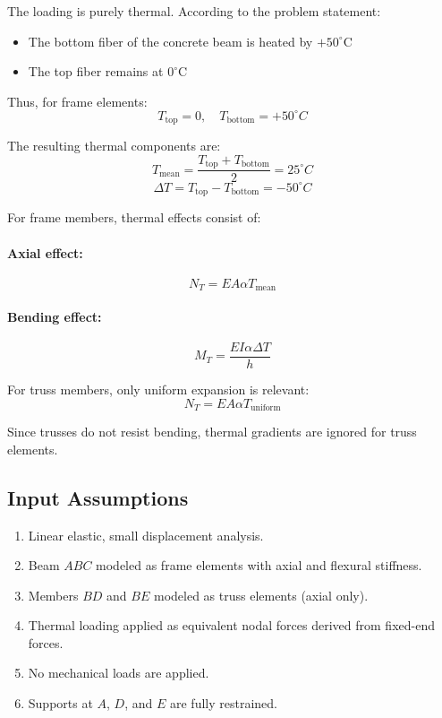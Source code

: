 The loading is purely thermal. According to the problem statement:

\begin{itemize}
    \item The bottom fiber of the concrete beam is heated by $+50^\circ$C
    \item The top fiber remains at $0^\circ$C
\end{itemize}

Thus, for frame elements:
\[
T_{\text{top}} = 0, \quad T_{\text{bottom}} = +50^\circ C
\]

The resulting thermal components are:
\[
T_{\text{mean}} = \frac{T_{\text{top}} + T_{\text{bottom}}}{2} = 25^\circ C
\]
\[
\Delta T = T_{\text{top}} - T_{\text{bottom}} = -50^\circ C
\]

For frame members, thermal effects consist of:

\paragraph{Axial effect:}
\[
N_T = E A \alpha T_{\text{mean}}
\]

\paragraph{Bending effect:}
\[
M_T = \frac{E I \alpha \Delta T}{h}
\]

For truss members, only uniform expansion is relevant:
\[
N_T = E A \alpha T_{\text{uniform}}
\]

Since trusses do not resist bending, thermal gradients are ignored for truss elements.

\subsection{Input Assumptions}

\begin{enumerate}
    \item Linear elastic, small displacement analysis.
    \item Beam $ABC$ modeled as frame elements with axial and flexural stiffness.
    \item Members $BD$ and $BE$ modeled as truss elements (axial only).
    \item Thermal loading applied as equivalent nodal forces derived from fixed-end forces.
    \item No mechanical loads are applied.
    \item Supports at $A$, $D$, and $E$ are fully restrained.
\end{enumerate}

